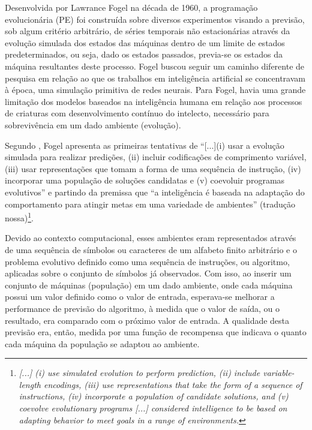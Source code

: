 Desenvolvida por Lawrance Fogel na década de 1960, a programação evolucionária (PE) foi construída sobre diversos experimentos visando a previsão, sob algum critério arbitrário, de séries temporais não estacionárias através da evolução simulada dos estados das máquinas dentro de um limite de estados predeterminados, ou seja, dado os estados passados, previa-se os estados da máquina resultantes deste processo. Fogel buscou seguir um caminho diferente de pesquisa em relação ao que os trabalhos em inteligência artificial se concentravam à época, uma simulação primitiva de redes neurais. Para Fogel, havia uma grande limitação dos modelos baseados na inteligência humana em relação aos processos de criaturas com desenvolvimento contínuo do intelecto, necessário para sobrevivência em um dado ambiente (evolução).

Segundo \citet[pg.A2.3:3]{back_handbook_1997}, Fogel apresenta as primeiras tentativas de \enquote{[...](i) usar a evolução simulada para realizar predições, (ii) incluir codificações de comprimento variável, (iii) usar representações que tomam a forma de uma sequência de instrução, (iv) incorporar uma população de soluções candidatas e (v) coevoluir programas evolutivos} e partindo da premissa que \enquote{a inteligência é baseada na adaptação do comportamento para atingir metas em uma variedade de ambientes} (tradução nossa)\footnote{\textit{[...] (i) use simulated evolution to perform prediction, (ii) include variable-length encodings, (iii) use representations that take the form of a sequence of instructions, (iv) incorporate a population of candidate solutions, and (v) coevolve evolutionary programs [...] considered intelligence to be based on adapting behavior to meet goals in a range of environments.}}.

Devido ao contexto computacional, esses ambientes eram representados através de uma sequência de símbolos ou caracteres de um alfabeto finito arbitrário e o problema evolutivo definido como uma sequência de instruções, ou algoritmo, aplicadas sobre o conjunto de símbolos já observados. Com isso, ao inserir um conjunto de máquinas (população) em um dado ambiente, onde cada máquina possui um valor definido como o valor de entrada, esperava-se melhorar a performance de previsão do algoritmo, à medida que o valor de saída, ou o resultado, era comparado com o próximo valor de entrada. A qualidade desta previsão era, então, medida por uma função de recompensa que indicava o quanto cada máquina da população se adaptou ao ambiente.

